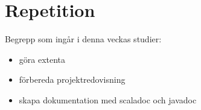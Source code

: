\chapter{Repetition}\label{chapter:W13}
Begrepp som ingår i denna veckas studier:
\begin{itemize}[noitemsep,label={$\square$},leftmargin=*]
\item göra extenta
\item förbereda projektredovisning
\item skapa dokumentation med scaladoc och javadoc\end{itemize}
